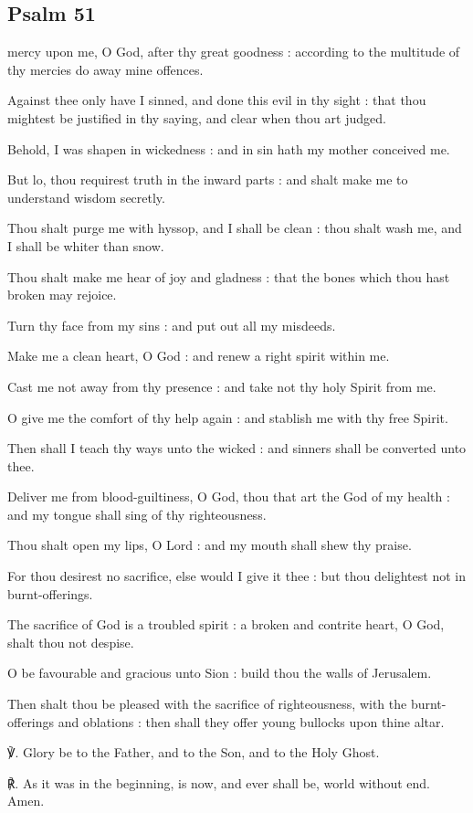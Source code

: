 \subsection{Psalm 51}
 mercy upon me, O God, after thy great goodness : according to the multitude of thy mercies do away mine offences.\par
{}
Against thee only have I sinned, and done this evil in thy sight : that thou mightest be justified in thy saying, and clear when thou art judged.\par
{}Behold, I was shapen in wickedness : and in sin hath my mother conceived me.\par
{}But lo, thou requirest truth in the inward parts : and shalt make me to understand wisdom secretly.\par
{}Thou shalt purge me with hyssop, and I shall be clean : thou shalt wash me, and I shall be whiter than snow.\par
{}Thou shalt make me hear of joy and gladness : that the bones which thou hast broken may rejoice.\par
{}Turn thy face from my sins : and put out all my misdeeds.\par
{}Make me a clean heart, O God : and renew a right spirit within me.\par
{}Cast me not away from thy presence : and take not thy holy Spirit from me.\par
{}O give me the comfort of thy help again : and stablish me with thy free Spirit.\par
{}Then shall I teach thy ways unto the wicked : and sinners shall be converted unto thee.\par
{}Deliver me from blood-guiltiness, O God, thou that art the God of my health : and my tongue shall sing of thy righteousness.\par
{}Thou shalt open my lips, O Lord : and my mouth shall shew thy praise.\par
{}For thou desirest no sacrifice, else would I give it thee : but thou delightest not in burnt-offerings.\par
{}The sacrifice of God is a troubled spirit : a broken and contrite heart, O God, shalt thou not despise.\par
{}O be favourable and gracious unto Sion : build thou the walls of Jerusalem.\par
{}Then shalt thou be pleased with the sacrifice of righteousness, with the burnt-offerings and oblations : then shall they offer young bullocks upon thine altar.\par
℣. Glory be to the Father, and to the Son, and to the Holy Ghost.\par
℟. As it was in the beginning, is now, and ever shall be, world without end. Amen.\par
\vspace{-3ex}
